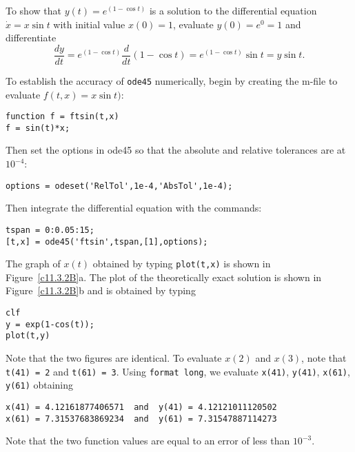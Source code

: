 \begin{figure}[htb]
     \centerline{%
     }
\end{figure} 


To show that $y(t)=e^{(1-\cos t)}$ is a solution to the differential equation
$\dot{x}=x\sin t$ with initial value $x(0)=1$, evaluate $y(0)=e^0=1$ and
differentiate
\[
\frac{dy}{dt} = e^{(1-\cos t)}\frac{d}{dt}(1-\cos t) = 
e^{(1-\cos t)}\sin t = y\sin t.
\]

To establish the accuracy of {\tt ode45} numerically, begin by creating the 
m-file to evaluate $f(t,x)=x\sin t)$:
\begin{verbatim}
function f = ftsin(t,x)
f = sin(t)*x;
\end{verbatim}
Then set the options in {\sf ode45} so that the absolute and relative
tolerances are at $10^{-4}$:
\begin{verbatim}
options = odeset('RelTol',1e-4,'AbsTol',1e-4);
\end{verbatim}
Then integrate the differential equation with the commands:
\begin{verbatim}
tspan = 0:0.05:15;
[t,x] = ode45('ftsin',tspan,[1],options);
\end{verbatim}
The graph of $x(t)$ obtained by typing {\tt plot(t,x)} is shown in
Figure~\ref{c11.3.2B}a.  The plot of the theoretically exact solution
is shown in Figure~\ref{c11.3.2B}b and is obtained by typing
\begin{verbatim}
clf
y = exp(1-cos(t));
plot(t,y)
\end{verbatim}
Note that the two figures are identical.  To evaluate $x(2)$ and $x(3)$,
note that {\tt t(41) = 2} and {\tt t(61) = 3}.  Using {\tt format long}, we
evaluate {\tt x(41)}, {\tt y(41)}, {\tt x(61)}, {\tt y(61)} obtaining
\begin{verbatim}
x(41) = 4.12161877406571  and  y(41) = 4.12121011120502
x(61) = 7.31537683869234  and  y(61) = 7.31547887114273
\end{verbatim}
Note that the two function values are equal to an error of less than 
$10^{-3}$.

\begin{figure}[htb]
     \centerline{%
     }
\end{figure} 



